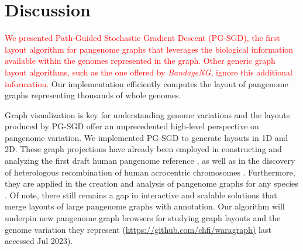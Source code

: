 \documentclass{bioinfo}
\theoremstyle{definition}
\newcommand{\red}[1]{{\textcolor{Red}{#1}}}
\begin{document}
	\section{Discussion}
	\label{sec:discussion}
	
	\red{We presented Path-Guided Stochastic Gradient Descent (PG-SGD), the first layout algorithm for pangenome graphs that leverages the biological information available within the genomes represented in the graph. 
	Other generic graph layout algorithms, such as the one offered by \textit{BandageNG}, ignore this additional information.}
	Our implementation efficiently computes the layout of pangenome graphs representing thousands of whole genomes.
	
	Graph visualization is key for understanding genome variations and the layouts produced by PG-SGD offer an unprecedented high-level perspective on pangenome variation.
	We implemented PG-SGD to generate layouts in 1D and 2D.
	These graph projections have already been employed in constructing and analyzing the first draft human pangenome reference \citep{Liao2023}, as well as in the discovery of heterologous recombination of human acrocentric chromosomes \citep{Guarracino2023}.
	Furthermore, they are applied in the creation and analysis of pangenome graphs for any species \citep{Guarracino2022, Garrison2023}.
	Of note, there still remains a gap in interactive and scalable solutions that merge layouts of large pangenome graphs with annotation.
	Our algorithm will underpin new pangenome graph browsers for studying graph layouts and the genome variation they represent (\url{https://github.com/chfi/waragraph)} last accessed Jul 2023).
	
\end{document}
